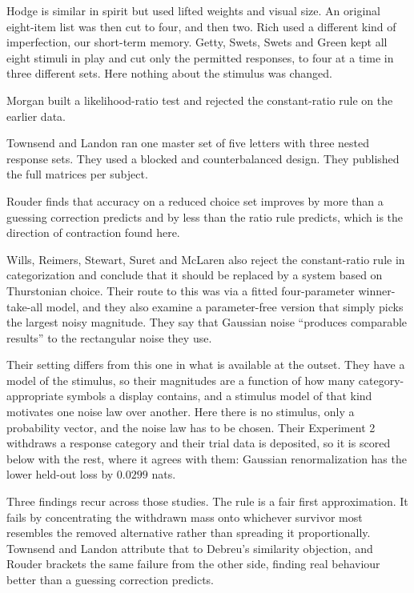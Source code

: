 \documentclass[11pt]{article}
\theoremstyle{italichead}
\begin{document}
Hodge \cite{hodge1967} is similar in spirit but used lifted weights and visual size. An original
eight-item list was then cut to four, and then two. Rich \cite{rich1971} used a different kind of
imperfection, our short-term memory. Getty, Swets, Swets and Green \cite{getty1979} kept all
eight stimuli in play and cut only the permitted responses, to four at a time in three different
sets. Here nothing about the stimulus was changed.

Morgan \cite{morgan1974} built a likelihood-ratio test and rejected the constant-ratio rule on
the earlier data.

Townsend and Landon \cite{townsendlandon1982} ran one master set of five letters with three
nested response sets. They used a blocked and counterbalanced design. They published the full
matrices per subject.

Rouder \cite{rouder2004} finds that accuracy on a reduced choice set improves by more than a
guessing correction predicts and by less than the ratio rule predicts, which is the direction of
contraction found here.

Wills, Reimers, Stewart, Suret and McLaren \cite{wills2000} also reject the constant-ratio rule
in categorization and conclude that it should be replaced by a system based on Thurstonian
choice. Their route to this was via a fitted four-parameter winner-take-all model, and they also examine a parameter-free version that simply
picks the largest noisy magnitude. They say that Gaussian noise ``produces comparable results''
to the rectangular noise they use.

Their setting differs from this one in what is available at the outset. They have a model of the
stimulus, so their magnitudes are a function of how many category-appropriate symbols a display
contains, and a stimulus model of that kind motivates one noise law over another. Here there is
no stimulus, only a probability vector, and the noise law has to be chosen. Their Experiment 2
withdraws a response category and their trial data is deposited, so it is scored below with the
rest, where it agrees with them: Gaussian renormalization has the lower held-out loss by
$0.0299$ nats.

Three findings recur across those studies. The rule is a fair first approximation. It fails by
concentrating the withdrawn mass onto whichever survivor most resembles the removed alternative
rather than spreading it proportionally. Townsend and Landon attribute that to Debreu's
similarity objection, and Rouder brackets the same failure from the other side, finding real
behaviour better than a guessing correction predicts.
\end{document}
